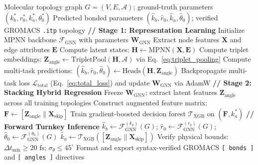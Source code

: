 \documentclass[11pt,a4paper]{article}
\begin{document}
\begin{algorithm}[htbp]
\caption{End-to-End Training and Two-Stage Forward Inference Pipeline}
\label{alg:pipeline}
\begin{algorithmic}[1]
\Require Molecular topology graph $G = (V, E, \mathcal{A})$; ground-truth parameters $(k_b^*, r_0^*, k_a^*, \theta_0^*)$
\Ensure Predicted bonded parameters $(\hat{k}_b, \hat{r}_0, \hat{k}_a, \hat{\theta}_0)$; verified GROMACS \texttt{.itp} topology
\State \textbf{// Stage 1: Representation Learning}
\State Initialize MPNN backbone $\mathcal{F}_{\text{GNN}}$ with parameters $\mathbf{W}_{\text{GNN}}$
    \State Extract node features $\mathbf{X}$ and edge attributes $\mathbf{E}$
    \State Compute latent states: $\mathbf{H} \leftarrow \text{MPNN}(\mathbf{X}, \mathbf{E})$
    \State Compute triplet embeddings: $\mathbf{Z}_{\text{angle}} \leftarrow \text{TripletPool}(\mathbf{H}, \mathcal{A})$ via Eq.~\ref{eq:triplet_pooling}
    \State Compute multi-task predictions: $(\hat{k}_b, \hat{r}_0, \hat{\theta}_0) \leftarrow \text{Heads}(\mathbf{H}, \mathbf{Z}_{\text{angle}})$
    \State Backpropagate multi-task loss $\mathcal{L}_{\text{total}}$ (Eq.~\ref{eq:total_loss}) and update $\mathbf{W}_{\text{GNN}}$ via AdamW
\EndFor
\State \textbf{// Stage 2: Stacking Hybrid Regression}
\State Freeze $\mathbf{W}_{\text{GNN}}$; extract latent features $\mathbf{Z}_{\text{angle}}$ across all training topologies
\State Construct augmented feature matrix: $\mathbf{F} \leftarrow [\mathbf{Z}_{\text{angle}} \parallel \mathbf{X}_{\text{skip}}]$
\State Train gradient-boosted decision forest $\mathcal{T}_{\text{XGB}}$ on $(\mathbf{F}, k_a^*)$
\State \textbf{// Forward Turnkey Inference}
\State $\hat{k}_b \leftarrow \mathcal{F}_{\text{GNN}}^{(k_b)}(G)$; $\hat{r}_0 \leftarrow \mathcal{F}_{\text{GNN}}^{(r_0)}(G)$; $\hat{\theta}_0 \leftarrow \mathcal{F}_{\text{GNN}}^{(\theta_0)}(G)$
\State $\hat{k}_a \leftarrow \mathcal{T}_{\text{XGB}}([\mathbf{Z}_{\text{angle}} \parallel \mathbf{X}_{\text{skip}}])$
\State Verify physical bounds: $\Delta t_{\min} \ge 20\text{ fs}$; $\sigma_\theta \le 45^\circ$
\State Format and export syntax-verified GROMACS \texttt{[ bonds ]} and \texttt{[ angles ]} directives
\end{algorithmic}
\end{algorithm}

\end{document}
